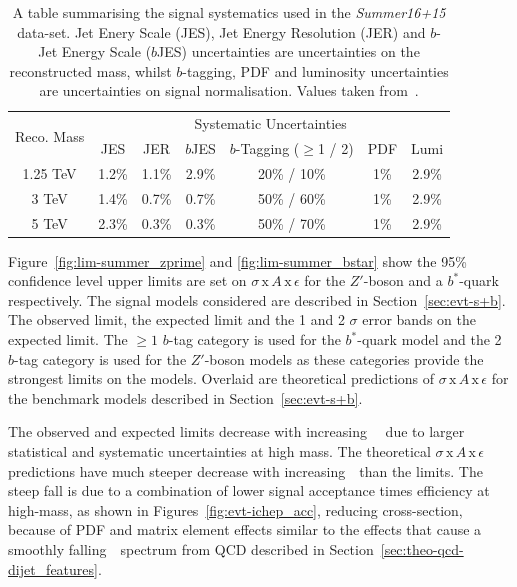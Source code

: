 \begin{table}[!htb]
  \centering
  \begin{tabular}{|c||c|c|c|c|c|c|}
    \hline
\multirow{2}{*}{Reco. Mass} & \multicolumn{6}{c|}{Systematic Uncertainties}                    \\ \cline{2-7} 
                            & JES   & JER   & $b$JES  & $b$-Tagging ($\geq$1 / 2) & PDF & Lumi  \\
\hline
1.25 TeV                    & 1.2\% & 1.1\% & 2.9\% &          20\% / 10\%      & 1\% & 2.9\% \\
3 TeV                       & 1.4\% & 0.7\% & 0.7\% &          50\% / 60\%      & 1\% & 2.9\% \\
5 TeV                       & 2.3\% & 0.3\% & 0.3\% &          50\% / 70\%      & 1\% & 2.9\% \\
\hline
  \end{tabular}
  \caption[A table summarising the signal systematics used in the \textit{Summer16+15} data-set.
    Jet Enery Scale (JES), Jet Energy Resolution (JER) and $b$-Jet Energy Scale ($b$JES) uncertainties
    are uncertainties on the reconstructed mass,
    whilst $b$-tagging, PDF and luminosity uncertainties are uncertainties on signal normalisation.]
          {A table summarising the signal systematics used in the \textit{Summer16+15} data-set.
    Jet Enery Scale (JES), Jet Energy Resolution (JER) and $b$-Jet Energy Scale ($b$JES) uncertainties
    are uncertainties on the reconstructed mass,
    whilst $b$-tagging, PDF and luminosity uncertainties are uncertainties on signal normalisation.
    Values taken from~\cite{dibjet-ichep_int}.}
  \label{tab:lim-summer_syst}
\end{table}

Figure~\ref{fig:lim-summer_zprime} and \ref{fig:lim-summer_bstar} show the
95\% confidence level upper limits are set on $\sigma\,\text{x}\,\mathit{A}\,\text{x}\,\epsilon$
for the $Z'$-boson and a $b^*$-quark respectively.
The signal models considered are described in Section~\ref{sec:evt-s+b}.
The observed limit, the expected limit and the 1 and 2 $\sigma$ error bands on the expected limit.
The $\geq1$ $b$-tag category is used for the $b^*$-quark model
and the 2 $b$-tag category is used for the $Z'$-boson models
as these categories provide the strongest limits on the models.
Overlaid are theoretical predictions of
$\sigma\,\text{x}\,\mathit{A}\,\text{x}\,\epsilon$ for the benchmark models described in Section~\ref{sec:evt-s+b}.

The observed and expected limits decrease with increasing~\mjj~
due to larger statistical and systematic uncertainties at high mass.
The theoretical $\sigma\,\text{x}\,\mathit{A}\,\text{x}\,\epsilon$ predictions
have much steeper decrease with increasing~\mjj~than the limits.
The steep fall is due to a combination of
lower signal acceptance times efficiency at high-mass, as shown in Figures~\ref{fig:evt-ichep_acc},
reducing cross-section, because of PDF and matrix element effects similar to the effects that cause a
smoothly falling~\mjj~spectrum from QCD described in Section~\ref{sec:theo-qcd-dijet_features}.

